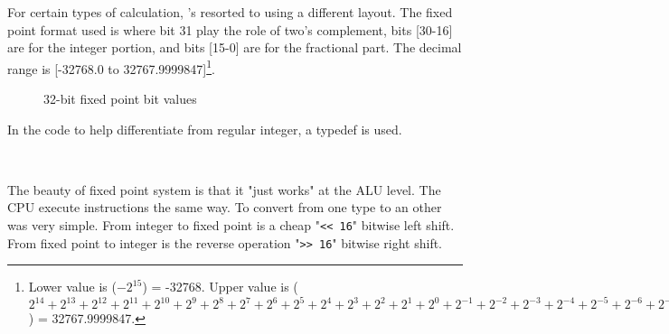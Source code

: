For certain types of calculation, \doom's resorted to using a different layout. The fixed point format used is  where bit 31 play the role of two's complement, bits [30-16] are for the integer portion, and bits [15-0] are for the fractional part. The decimal range is [-32768.0 to 32767.9999847]\footnote{
Lower value is ($-2^{15}$) = -32768. Upper value is  
 ($2^{14} + 2^{13} + 2^{12} + 2^{11} + 2^{10} + 2^9 + 2^8 + 2^7 + 2^6 + 2^5 + 2^4 + 2^3 + 2^2 + 2^1 + 2^0 + 2^{-1} + 2^{-2}+ 2^{-3}+ 2^{-4}+ 2^{-5}+ 2^{-6}+ 2^{-7}+ 2^{-8}+ 2^{-9}+ 2^{-10}+ 2^{-11}+ 2^{-12}+ 2^{-13}+ 2^{-14}+ 2^{-15}+ 2^{-16}$) = 32767.9999847.}.\\
\par
\begin{figure}[H]
 \centering
  
  \caption{32-bit \doom fixed point bit values}
\end{figure}
\par 
In the code to help differentiate from regular integer, a typedef  is used.\\
\par
{}\\
\par
The beauty of fixed point system is that it "just works" at the ALU level. The CPU execute instructions the same way. To convert from one type to an other was very simple. From integer to fixed point is a cheap "\verb!<< 16!" bitwise left shift. From fixed point to integer is the reverse operation "\verb|>> 16|" bitwise right shift.\\
\par


